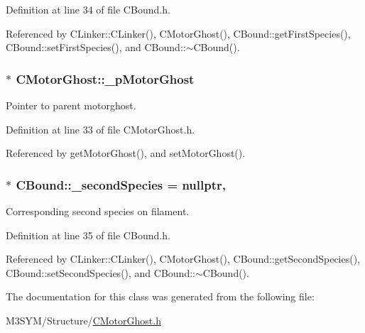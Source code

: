 Definition at line 34 of file C\+Bound.\+h.



Referenced by C\+Linker\+::\+C\+Linker(), C\+Motor\+Ghost(), C\+Bound\+::get\+First\+Species(), C\+Bound\+::set\+First\+Species(), and C\+Bound\+::$\sim$\+C\+Bound().

\hypertarget{classCMotorGhost_a248b8fee5ba1d85c989f666e3a908261}{
\subsubsection[{\+\_\+p\+Motor\+Ghost}]{$\ast$ C\+Motor\+Ghost\+::\+\_\+p\+Motor\+Ghost\hspace{0.3cm}{\ttfamily [private]}}}\label{classCMotorGhost_a248b8fee5ba1d85c989f666e3a908261}


Pointer to parent motorghost. 



Definition at line 33 of file C\+Motor\+Ghost.\+h.



Referenced by get\+Motor\+Ghost(), and set\+Motor\+Ghost().

\hypertarget{classCBound_ae6818ab861d273598a2507be75183e41}{
\subsubsection[{\+\_\+second\+Species}]{$\ast$ C\+Bound\+::\+\_\+second\+Species = nullptr\hspace{0.3cm}{\ttfamily [protected]}, {\ttfamily [inherited]}}}\label{classCBound_ae6818ab861d273598a2507be75183e41}


Corresponding second species on filament. 



Definition at line 35 of file C\+Bound.\+h.



Referenced by C\+Linker\+::\+C\+Linker(), C\+Motor\+Ghost(), C\+Bound\+::get\+Second\+Species(), C\+Bound\+::set\+Second\+Species(), and C\+Bound\+::$\sim$\+C\+Bound().



The documentation for this class was generated from the following file\+:\begin{DoxyCompactItemize}
\item 
M3\+S\+Y\+M/\+Structure/\hyperlink{CMotorGhost_8h}{C\+Motor\+Ghost.\+h}\end{DoxyCompactItemize}
